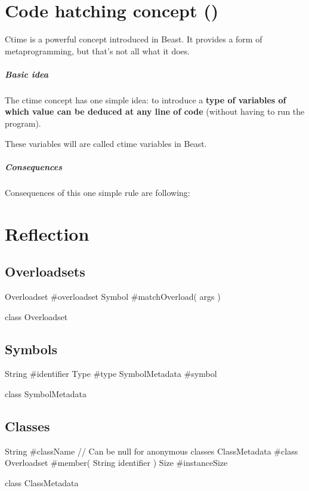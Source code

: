 \chapter{Code hatching concept ()} \label{ctime}
Ctime is a powerful concept introduced in Beast. It provides a form of metaprogramming, but that's not all what it does.

\paragraph{Basic idea}
The ctime concept has one simple idea: to introduce a \textbf{type of variables of which value can be deduced at any line of code} (without having to run the program).

These variables will are called ctime variables in Beast.

\paragraph{Consequences} Consequences of this one simple rule are following:

\chapter{Reflection} \label{reflection}

\section{Overloadsets}
\begin{code}
Overloadset #overloadset
Symbol #matchOverload( args )

class Overloadset {
}
\end{code}

\section{Symbols}
\begin{code}
String #identifier
Type #type
SymbolMetadata #symbol

class SymbolMetadata {

}
\end{code}

\section{Classes}
\begin{code}
String #className // Can be null for anonymous classes
ClassMetadata #class
Overloadset #member( String identifier )
Size #instanceSize

class ClassMetadata {
}
\end{code}

